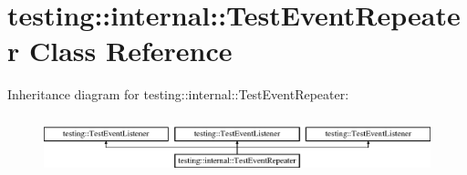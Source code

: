 \hypertarget{classtesting_1_1internal_1_1_test_event_repeater}{}\section{testing\+::internal\+::Test\+Event\+Repeater Class Reference}
\label{classtesting_1_1internal_1_1_test_event_repeater}
Inheritance diagram for testing\+::internal\+::Test\+Event\+Repeater\+:\begin{figure}[H]
\begin{center}
\leavevmode
\includegraphics[height=1.728395cm]{d2/d7d/classtesting_1_1internal_1_1_test_event_repeater}
\end{center}
\end{figure}
